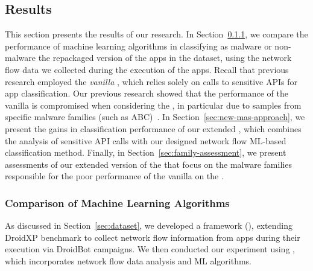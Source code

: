 \subsection{Results}\label{sec:results}

This section presents the results of our research. In Section~\ref{sec:ml}, we compare the
performance of machine learning algorithms in classifying as malware or non-malware the
repackaged version of the apps in the \cds dataset, using the network flow data we
collected during the execution of the apps. Recall that previous research employed the \emph{vanilla}
\mas, which relies solely on calls to sensitive APIs for app classification. Our previous
research showed that the performance of the vanilla \mas is compromised when considering
the \cds, in particular due to samples from specific malware families {\color{red}(such as ABC)~\cite{}}.
In Section~\ref{sec:new-mas-approach}, we present the gains in classification performance of our extended \mas,
which combines the analysis of sensitive API calls with our designed network flow ML-based classification method.
Finally, in Section~\ref{sec:family-assessment}, we present assessments of our extended
version of the \mas that focus on the malware families responsible for the poor performance of
the vanilla \mas on the \cds.

\subsubsection{Comparison of Machine Learning Algorithms}\label{sec:ml}

As discussed in Section~\ref{sec:dataset}, we developed a framework (\droidxpflow), extending DroidXP benchmark to collect network flow information from apps during their execution via DroidBot campaigns. We then conducted our experiment using \droidxpflow, which incorporates network flow data analysis and ML algorithms.

